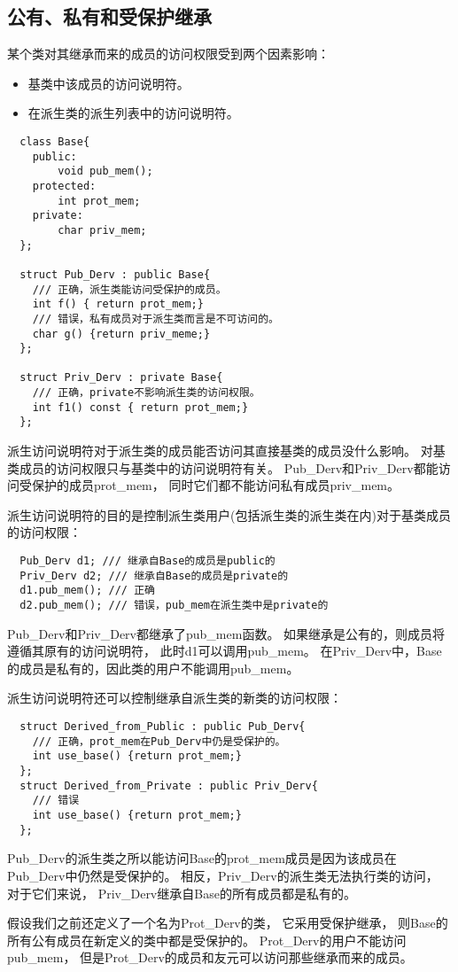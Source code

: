 \subsection{公有、私有和受保护继承}
某个类对其继承而来的成员的访问权限受到两个因素影响：
\begin{itemize}
\item{基类中该成员的访问说明符。}
\item{在派生类的派生列表中的访问说明符。}
\end{itemize}
\begin{lstlisting}
  class Base{
    public:
        void pub_mem();
    protected:
        int prot_mem;
    private:
        char priv_mem;
  };

  struct Pub_Derv : public Base{
    /// 正确，派生类能访问受保护的成员。
    int f() { return prot_mem;}
    /// 错误，私有成员对于派生类而言是不可访问的。
    char g() {return priv_meme;}
  };

  struct Priv_Derv : private Base{
    /// 正确，private不影响派生类的访问权限。
    int f1() const { return prot_mem;}
  };
\end{lstlisting}
派生访问说明符对于派生类的成员能否访问其直接基类的成员没什么影响。%
对基类成员的访问权限只与基类中的访问说明符有关。%
Pub\_Derv和Priv\_Derv都能访问受保护的成员prot\_mem，%
同时它们都不能访问私有成员priv\_mem。%
\par
派生访问说明符的目的是控制派生类用户(包括派生类的派生类在内)对于基类成员的访问权限：
\begin{lstlisting}
  Pub_Derv d1; /// 继承自Base的成员是public的
  Priv_Derv d2; /// 继承自Base的成员是private的
  d1.pub_mem(); /// 正确
  d2.pub_mem(); /// 错误，pub_mem在派生类中是private的
\end{lstlisting}
Pub\_Derv和Priv\_Derv都继承了pub\_mem函数。%
如果继承是公有的，则成员将遵循其原有的访问说明符，%
此时d1可以调用pub\_mem。%
在Priv\_Derv中，Base的成员是私有的，因此类的用户不能调用pub\_mem。%
\par
派生访问说明符还可以控制继承自派生类的新类的访问权限：
\begin{lstlisting}
  struct Derived_from_Public : public Pub_Derv{
    /// 正确，prot_mem在Pub_Derv中仍是受保护的。
    int use_base() {return prot_mem;}
  };
  struct Derived_from_Private : public Priv_Derv{
    /// 错误
    int use_base() {return prot_mem;}
  };
\end{lstlisting}
Pub\_Derv的派生类之所以能访问Base的prot\_mem成员是因为该成员在Pub\_Derv中仍然是受保护的。%
相反，Priv\_Derv的派生类无法执行类的访问，%
对于它们来说，%
Priv\_Derv继承自Base的所有成员都是私有的。%
\par
假设我们之前还定义了一个名为Prot\_Derv的类，%
它采用受保护继承，%
则Base的所有公有成员在新定义的类中都是受保护的。%
Prot\_Derv的用户不能访问pub\_mem，%
但是Prot\_Derv的成员和友元可以访问那些继承而来的成员。%
